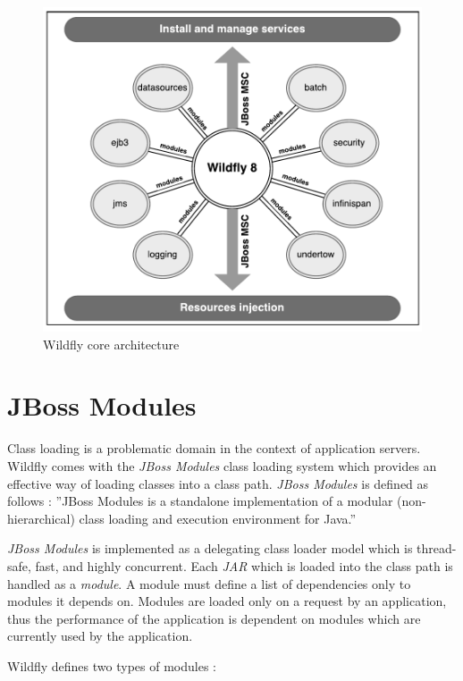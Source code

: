 \documentclass[12pt,oneside]{fithesis2}
\begin{document}
\begin{figure}[ht!]
	\centering
	\includegraphics[width=\textwidth]{images/wildfly_core}
	\caption{Wildfly core architecture \cite{wildfly_book}}
	\label{wildfly_core}
\end{figure}

\section{JBoss Modules}
\label{jboss_modules_sec}
Class loading is a problematic domain in the context of application servers. Wildfly comes with the \textit{JBoss Modules} class loading system which provides an effective way of loading classes into a class path. \textit{JBoss Modules} is defined as follows \cite[Introduction]{jboss_modules_doc}: ''JBoss Modules is a standalone implementation of a modular (non-hierarchical) class loading and execution environment for Java.''

\textit{JBoss Modules} is implemented as a delegating class loader model which is thread-safe, fast, and highly concurrent. Each \textit{JAR} which is loaded into the class path is handled as a \textit{module}. A module must define a list of dependencies only to modules it depends on. Modules are loaded only on a request by an application, thus the performance of the application is dependent on modules which are currently used by the application.

Wildfly defines two types of modules \cite{wildfly_book}:
\end{document}
